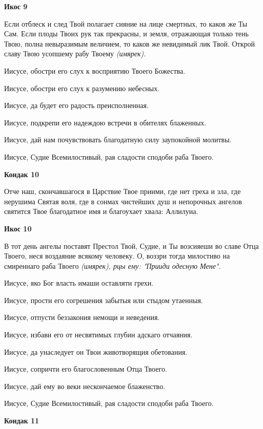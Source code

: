 \bfseries Икос 9\normalfont{}


Если отблеск и след Твой полагает сияние на лице смертных, то каков же Ты Сам. Если плоды Твоих рук так прекрасны, и земля, отражающая только тень Твою, полна невыразимым величием, то каков же невидимый лик Твой. Открой славу Твою усопшему рабу Твоему \itshape (имярек)\normalfont{}. 


Иисусе, обостри его слух к восприятию Твоего Божества. 


Иисусе, обостри его слух к разумению небесных. 


Иисусе, да будет его радость преисполненная. 


Иисусе, подкрепи его надеждою встречи в обителях блаженных. 


Иисусе, дай нам почувствовать благодатную силу заупокойной молитвы. 


Иисусе, Судие Всемилостивый, рая сладости сподоби раба Твоего.




\bfseries Кондак 10\normalfont{}


Отче наш, скончавшагося в Царствие Твое приими, где нет греха и зла, где нерушима Святая воля, где в сонмах чистейших душ и непорочных ангелов святится Твое благодатное имя и благоухает хвала: Аллилуиа.




\bfseries Икос 10\normalfont{}


В тот день ангелы поставят Престол Твой, Судие, и Ты возсияеши во славе Отца Твоего, неся воздаяние всякому человеку. О, воззри тогда милостиво на смиреннаго раба Твоего \itshape (имярек)\normalfont{}, рцы ему: "Прииди одесную Мене". 


Иисусе, яко Бог власть имаши оставляти грехи. 


Иисусе, прости его согрешения забытыя или стыдом утаенныя. 


Иисусе, отпусти беззакония немощи и неведения. 


Иисусе, избави его от несвятимых глубин адскаго отчаяния. 


Иисусе, да унаследует он Твои животворящия обетования. 


Иисусе, сопричти его благословенным Отца Твоего. 


Иисусе, дай ему во веки нескончаемое блаженство. 


Иисусе, Судие Всемилостивый, рая сладости сподоби раба Твоего.




\bfseries Кондак 11\normalfont{}



